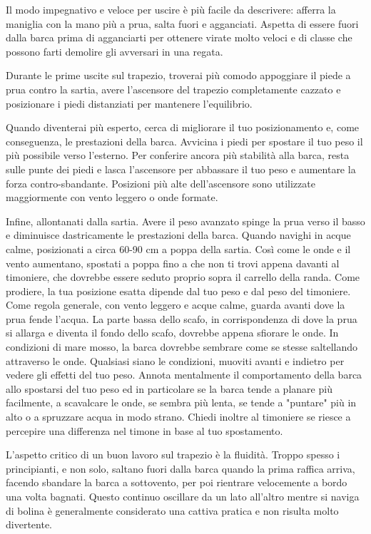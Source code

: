 Il modo impegnativo e veloce per uscire è più facile da descrivere: afferra la
maniglia con la mano più a prua, salta fuori e agganciati. Aspetta di essere
fuori dalla barca prima di agganciarti per ottenere virate molto veloci e di
classe che possono farti demolire gli avversari in una regata.

Durante le prime uscite sul trapezio, troverai più comodo appoggiare il piede a
prua contro la sartia, avere l'ascensore del trapezio completamente cazzato e posizionare
i piedi distanziati per mantenere l'equilibrio.

Quando diventerai più esperto, cerca di migliorare il tuo posizionamento e, come
conseguenza, le prestazioni della barca. Avvicina i piedi per spostare il tuo peso il più
possibile verso l'esterno. Per conferire ancora più stabilità alla barca, resta
sulle punte dei
piedi e lasca l'ascensore per abbassare il tuo peso e aumentare la forza
contro-sbandante.
Posizioni più alte dell'ascensore sono utilizzate maggiormente con
vento leggero o onde formate.

Infine, allontanati dalla sartia. Avere il peso avanzato spinge la prua verso il
basso e diminuisce dastricamente le prestazioni della barca. Quando navighi in
acque calme, posizionati a circa 60-90 cm a poppa della sartia. Così come le
onde e il vento aumentano, spostati a poppa fino a che non ti trovi appena
davanti al timoniere, che dovrebbe essere seduto proprio sopra il carrello della
randa. Come prodiere, la tua posizione esatta dipende dal tuo peso e dal peso
del timoniere. Come regola generale, con vento leggero e acque calme, guarda
avanti dove la prua fende l'acqua. La parte bassa dello scafo, in corrispondenza
di dove la prua si allarga e diventa il fondo dello scafo, dovrebbe appena
sfiorare le onde. In condizioni di mare mosso, la barca dovrebbe sembrare come
se stesse saltellando attraverso le onde. Qualsiasi siano le condizioni, muoviti
avanti e indietro per vedere gli effetti del tuo peso. Annota mentalmente il
comportamento della barca allo spostarsi del tuo peso ed in particolare se la
barca tende a planare più facilmente, a scavalcare le onde, se sembra più lenta,
se tende a "puntare" più in alto o a spruzzare acqua in modo strano. Chiedi
inoltre al timoniere se riesce a percepire una differenza nel timone in base al
tuo spostamento.

L'aspetto critico di un buon lavoro sul trapezio è la fluidità. Troppo spesso i
principianti, e non solo, saltano fuori dalla barca quando la prima raffica
arriva, facendo sbandare la barca a sottovento, per poi rientrare velocemente a
bordo una volta bagnati. Questo continuo oscillare da un lato all'altro mentre
si naviga di bolina è generalmente considerato una cattiva pratica e non risulta
molto divertente.

